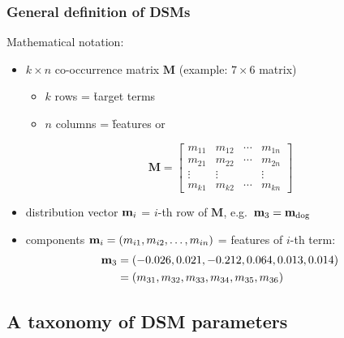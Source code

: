 \documentclass[t]{beamer} %
\begin{document}
\begin{frame}
  \frametitle{General definition of DSMs}

  Mathematical notation:
  \begin{itemize}
  \item $k \times n$ co-occurrence matrix $\mathbf{M}$ (example: $7\times 6$ matrix)
    \begin{itemize}
    \item $k$ rows = \h{target} terms 
    \item $n$ columns = \h{features} or 
    \end{itemize}
    \begin{small}
      \gap[.5]
      \[
      \mathbf{M} =
      \begin{bmatrix}
        m_{11} & m_{12} & \cdots & m_{1n} \\
        m_{21} & m_{22} & \cdots & m_{2n} \\
        \vdots & \vdots & & \vdots \\
        m_{k1} & m_{k2} & \cdots & m_{kn}
      \end{bmatrix}
      \]
    \end{small}
  \item distribution vector $\Vector{m}_i$ = $i$-th row of $\mathbf{M}$, e.g.\ $\Vector{m}_3 = \Vector{m}_{\text{dog}}$
  \item components $\Vector{m}_i = (m_{i1}, m_{i2}, \ldots, m_{in})$ = features of $i$-th term:
    \begin{align*}
      \Vector{m}_3 &= (-0.026, 0.021, -0.212, 0.064, 0.013, 0.014) \\
      &= (m_{31}, m_{32}, m_{33}, m_{34}, m_{35}, m_{36})
    \end{align*}
  \end{itemize}

\end{frame}


\subsection{A taxonomy of DSM parameters}
\end{document}
